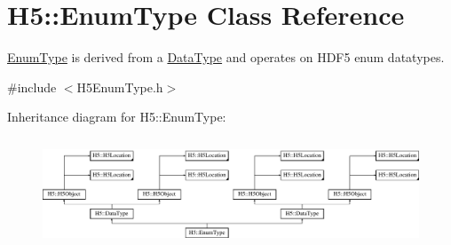\hypertarget{class_h5_1_1_enum_type}{}\section{H5\+:\+:Enum\+Type Class Reference}
\label{class_h5_1_1_enum_type}


\hyperlink{class_h5_1_1_enum_type}{Enum\+Type} is derived from a \hyperlink{class_h5_1_1_data_type}{Data\+Type} and operates on H\+D\+F5 enum datatypes.  




{\ttfamily \#include $<$H5\+Enum\+Type.\+h$>$}

Inheritance diagram for H5\+:\+:Enum\+Type\+:\begin{figure}[H]
\begin{center}
\leavevmode
\includegraphics[height=3.301887cm]{class_h5_1_1_enum_type}
\end{center}
\end{figure}
